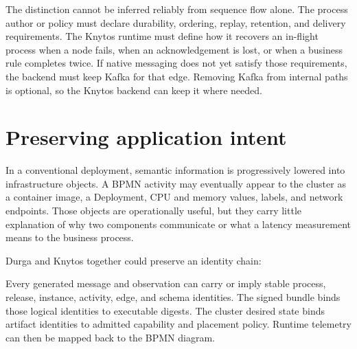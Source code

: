The distinction cannot be inferred reliably from sequence flow alone. The
process author or policy must declare durability, ordering, replay, retention,
and delivery requirements. The Knytos runtime must define how it recovers an
in-flight process when a node fails, when an acknowledgement is lost, or when a
business rule completes twice. If native messaging does not yet satisfy those
requirements, the backend must keep Kafka for that edge. Removing Kafka from
internal paths is optional, so the Knytos backend can keep it where needed.

\section{Preserving application intent}

In a conventional deployment, semantic information is progressively lowered
into infrastructure objects. A BPMN activity may eventually appear to the
cluster as a container image, a Deployment, CPU and memory values, labels, and
network endpoints. Those objects are operationally useful, but they carry
little explanation of why two components communicate or what a latency
measurement means to the business process.

Durga and Knytos together could preserve an identity chain:

\begin{center}
\end{center}

Every generated message and observation can carry or imply stable process,
release, instance, activity, edge, and schema identities. The signed bundle
binds those logical identities to executable digests. The cluster desired state
binds artifact identities to admitted capability and placement policy. Runtime
telemetry can then be mapped back to the BPMN diagram.

